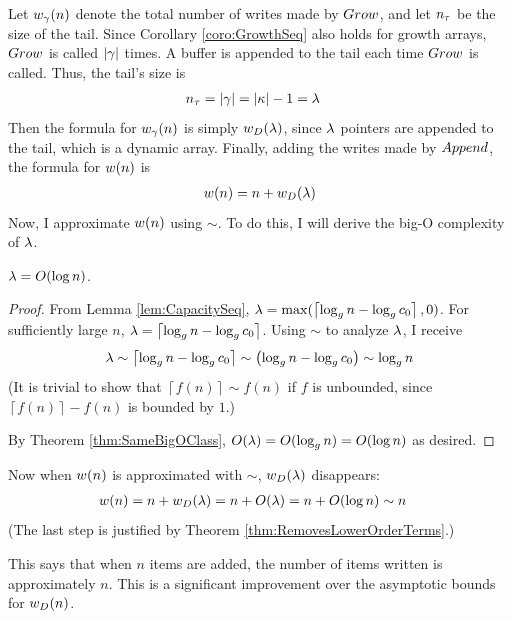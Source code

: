 Let ${w}_{\gamma}(n)$ denote the total number of writes made by $Grow$, and let $n_\tau$ be the size of the tail. Since Corollary \ref{coro:GrowthSeq} also holds for growth arrays, $Grow$ is called $|\gamma|$ times. A buffer is appended to the tail each time $Grow$ is called. Thus, the tail's size is
\begin{align*}
n_\tau &= |\gamma| = |\kappa| - 1 = \lambda
\end{align*}
Then the formula for ${w}_{\gamma}(n)$ is simply $w_D(\lambda)$, since $\lambda$ pointers are appended to the tail, which is a dynamic array. Finally, adding the writes made by $Append$, the formula for $w(n)$ is
\begin{align*}
w(n) = n + w_D(\lambda)
\end{align*}
Now, I approximate $w(n)$ using $\sim$. To do this, I will derive the big-O complexity of $\lambda$.

\begin{lemma}
\label{lem:VarUsefulIsOLogN}
	$\lambda = O(\log n)$.
\end{lemma}

\begin{proof}
	From Lemma \ref{lem:CapacitySeq}, $\lambda = \max(\left\lceil \log_{g} n - \log_{g} c_0 \right\rceil, 0)$. For sufficiently large $n$, $\lambda = \left\lceil \log_{g} n - \log_{g} c_0 \right\rceil$. Using $\sim$ to analyze $\lambda$, I receive
	\begin{align*}
	\lambda \sim \left\lceil \log_{g} n - \log_{g} c_0 \right\rceil \sim \left( \log_{g} n - \log_{g} c_0 \right) \sim \log_{g} n
	\end{align*}
	(It is trivial to show that $\left\lceil f(n) \right\rceil \sim f(n)$ if $f$ is unbounded, since $\left\lceil f(n) \right\rceil - f(n)$ is bounded by $1$.)
	
	By Theorem \ref{thm:SameBigOClass}, $O(\lambda) = O(\log_{g} n) = O(\log n)$ as desired.
\end{proof}

Now when $w(n)$ is approximated with $\sim$, $w_D(\lambda)$ disappears:
\begin{align*}
w(n) &= n + w_D(\lambda) = n + O(\lambda) = n + O(\log n) \sim n
\end{align*}
(The last step is justified by Theorem \ref{thm:RemovesLowerOrderTerms}.)

This says that when $n$ items are added, the number of items written is approximately $n$. This is a significant improvement over the asymptotic bounds for $w_D(n)$.

